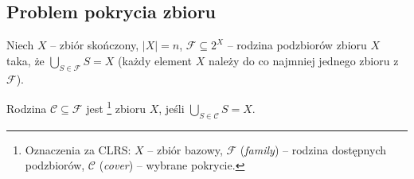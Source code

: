 \subsection{Problem pokrycia zbioru}

\begin{definition}
	Niech $X$ -- zbiór skończony, $|X| = n$, $\mathcal{F} \subseteq 2^X$ -- rodzina podzbiorów zbioru $X$ taka, że $\bigcup_{S \in \mathcal{F}} S = X$ (każdy element $X$ należy do co najmniej jednego zbioru z $\mathcal{F}$).

	Rodzina $\mathcal{C} \subseteq \mathcal{F}$ jest \footnote{Oznaczenia za CLRS: $X$ -- zbiór bazowy, $\mathcal{F}$ (\emph{family}) -- rodzina dostępnych podzbiorów, $\mathcal{C}$ (\emph{cover}) -- wybrane pokrycie.} zbioru $X$, jeśli $\bigcup_{S \in \mathcal{C}} S = X$.
\end{definition}


\newcommand{\Sone}{\textcolor{Scol1}{S_1}}
\newcommand{\Stwo}{\textcolor{Scol2}{S_2}}
\newcommand{\Sthree}{\textcolor{Scol3}{S_3}}
\newcommand{\Sfour}{\textcolor{Scol4}{S_4}}
\newcommand{\Sfive}{\textcolor{Scol5}{S_5}}
\newcommand{\Ssix}{\textcolor{Scol6}{S_6}}

